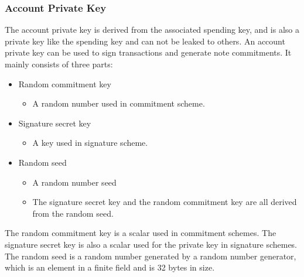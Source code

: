 \subsubsection{Account Private Key}\label{section: account-private-key}

The account private key is derived from the associated spending key, and is also a private key like the spending key and can not be leaked to others. An account private key can be used to sign transactions and generate note commitments. It mainly consists of three parts:

\begin{itemize}
    \item Random commitment key
        \begin{itemize}
            \item A random number used in commitment scheme.
        \end{itemize}
    \item Signature secret key
        \begin{itemize}
            \item A key used in signature scheme.
        \end{itemize}
    \item Random seed
        \begin{itemize}
            \item A random number seed
            \item The signature secret key and the random commitment key are all derived from the random seed.
        \end{itemize}
\end{itemize}

The random commitment key is a scalar used in commitment schemes. The signature secret key is also a scalar used for the private key in signature schemes. The random seed is a random number generated by a random number generator, which is an element in a finite field and is 32 bytes in size.
